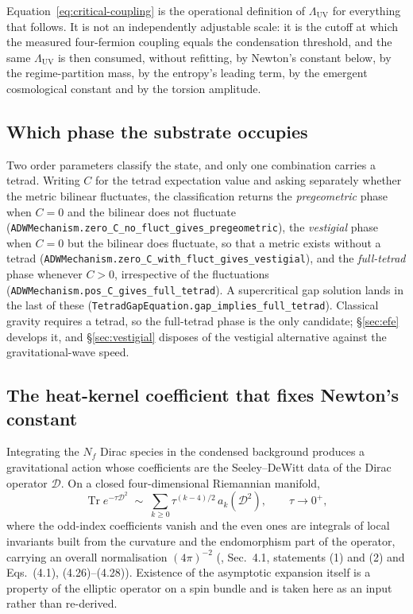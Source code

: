 \documentclass[aps,prd,nofootinbib,superscriptaddress,12pt]{revtex4-2}
\DeclareRobustCommand{\lb}{\discretionary{}{}{}}
\begin{document}
Equation~\eqref{eq:critical-coupling} is the operational definition of
$\Lambda_{\mathrm{UV}}$ for everything that follows. It is not an
independently adjustable scale: it is the cutoff at which the measured
four-fermion coupling equals the condensation threshold, and the same
$\Lambda_{\mathrm{UV}}$ is then consumed, without refitting, by Newton's
constant below, by the regime-partition mass, by the entropy's leading
term, by the emergent cosmological constant and by the torsion amplitude.

\subsection{Which phase the substrate occupies}
\label{sec:substrate-phases}

Two order parameters classify the state, and only one combination carries a
tetrad. Writing $C$ for the tetrad expectation value and asking separately
whether the metric bilinear fluctuates, the classification returns the
\emph{pregeometric} phase when $C = 0$ and the bilinear does not fluctuate
(\texttt{ADWMechanism.\lb{}zero\_\lb{}C\_\lb{}no\_\lb{}fluct\_\lb{}gives\_\lb{}pregeometric}), the
\emph{vestigial} phase when $C = 0$ but the bilinear does fluctuate, so
that a metric exists without a tetrad
(\texttt{ADWMechanism.\lb{}zero\_\lb{}C\_\lb{}with\_\lb{}fluct\_\lb{}gives\_\lb{}vestigial}), and the
\emph{full-tetrad} phase whenever $C > 0$, irrespective of the
fluctuations (\texttt{ADWMechanism.\lb{}pos\_\lb{}C\_\lb{}gives\_\lb{}full\_\lb{}tetrad}). A
supercritical gap solution lands in the last of these
(\texttt{Tetrad\lb{}Gap\lb{}Equation.\lb{}gap\_\lb{}implies\_\lb{}full\_\lb{}tetrad}). Classical gravity
requires a tetrad, so the full-tetrad phase is the only candidate;
\S\ref{sec:efe} develops it, and
\S\ref{sec:vestigial} disposes of the vestigial alternative
against the gravitational-wave speed.

\subsection{The heat-kernel coefficient that fixes Newton's constant}
\label{sec:substrate-heat-kernel}

Integrating the $N_f$ Dirac species in the condensed background produces a
gravitational action whose coefficients are the Seeley--DeWitt data of the
Dirac operator $\mathcal{D}$. On a closed four-dimensional Riemannian
manifold,
\begin{equation}
\label{eq:heat-kernel}
\operatorname{Tr}e^{-\tau\mathcal{D}^{2}}
\;\sim\; \sum_{k \ge 0}\tau^{(k-4)/2}\,a_{k}(\mathcal{D}^{2}),
\qquad \tau \to 0^{+},
\end{equation}
where the odd-index coefficients vanish and the even ones are integrals of
local invariants built from the curvature and the endomorphism part of the
operator, carrying an overall normalisation $(4\pi)^{-2}$
(\cite{Vassilevich2003}, Sec.~4.1, statements (1) and (2) and
Eqs.~(4.1), (4.26)--(4.28)). Existence of the asymptotic expansion itself
is a property of the elliptic operator on a spin bundle and is taken here
as an input rather than re-derived.
\end{document}
